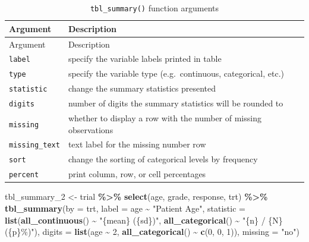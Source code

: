 \documentclass[
]{article}
\newenvironment{Shaded}{\begin{snugshade}}{\end{snugshade}}
\newcommand{\DataTypeTok}[1]{\textcolor[rgb]{0.13,0.29,0.53}{#1}}
\newcommand{\DecValTok}[1]{\textcolor[rgb]{0.00,0.00,0.81}{#1}}
\newcommand{\KeywordTok}[1]{\textcolor[rgb]{0.13,0.29,0.53}{\textbf{#1}}}
\newcommand{\NormalTok}[1]{#1}
\newcommand{\OperatorTok}[1]{\textcolor[rgb]{0.81,0.36,0.00}{\textbf{#1}}}
\newcommand{\StringTok}[1]{\textcolor[rgb]{0.31,0.60,0.02}{#1}}
\begin{document}
\begin{longtable}[]{@{}ll@{}}
\caption{\texttt{tbl\_summary()} function arguments}\tabularnewline
\toprule
Argument & Description\tabularnewline
\midrule
\endfirsthead
\toprule
Argument & Description\tabularnewline
\midrule
\endhead
\texttt{label} & specify the variable labels printed in
table\tabularnewline
\texttt{type} & specify the variable type (e.g.~continuous, categorical,
etc.)\tabularnewline
\texttt{statistic} & change the summary statistics
presented\tabularnewline
\texttt{digits} & number of digits the summary statistics will be
rounded to\tabularnewline
\texttt{missing} & whether to display a row with the number of missing
observations\tabularnewline
\texttt{missing\_text} & text label for the missing number
row\tabularnewline
\texttt{sort} & change the sorting of categorical levels by
frequency\tabularnewline
\texttt{percent} & print column, row, or cell percentages\tabularnewline
\bottomrule
\end{longtable}

\begin{Shaded}
\begin{Highlighting}[]
\NormalTok{tbl\_summary\_}\DecValTok{2}\NormalTok{ <{-}}
\StringTok{  }\NormalTok{trial }\OperatorTok{\%>\%}
\StringTok{  }\KeywordTok{select}\NormalTok{(age, grade, response, trt) }\OperatorTok{\%>\%}
\StringTok{  }\KeywordTok{tbl\_summary}\NormalTok{(}\DataTypeTok{by =}\NormalTok{ trt,}
              \DataTypeTok{label =}\NormalTok{ age }\OperatorTok{\textasciitilde{}}\StringTok{ "Patient Age"}\NormalTok{,}
              \DataTypeTok{statistic =} \KeywordTok{list}\NormalTok{(}\KeywordTok{all\_continuous}\NormalTok{() }\OperatorTok{\textasciitilde{}}\StringTok{ "\{mean\} (\{sd\})"}\NormalTok{,}
                               \KeywordTok{all\_categorical}\NormalTok{() }\OperatorTok{\textasciitilde{}}\StringTok{ "\{n\} / \{N\} (\{p\}\%)"}\NormalTok{),}
              \DataTypeTok{digits =} \KeywordTok{list}\NormalTok{(age }\OperatorTok{\textasciitilde{}}\StringTok{ }\DecValTok{2}\NormalTok{, }
                            \KeywordTok{all\_categorical}\NormalTok{() }\OperatorTok{\textasciitilde{}}\StringTok{ }\KeywordTok{c}\NormalTok{(}\DecValTok{0}\NormalTok{, }\DecValTok{0}\NormalTok{, }\DecValTok{1}\NormalTok{)),}
              \DataTypeTok{missing =} \StringTok{"no"}\NormalTok{)}
\end{Highlighting}
\end{Shaded}
\end{document}
